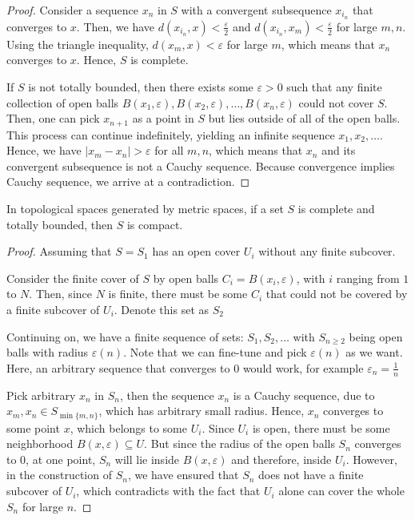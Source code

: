 \begin{proof}
  Consider a sequence \( x_{n} \) in \( S \) with a convergent subsequence \(
  x_{i_{n}} \) that converges to \( x \). Then, we have \( d(x_{i_{n}},x) <
  \frac{\varepsilon}{2} \) and \( d(x_{i_{n}}, x_{m}) < \frac{\varepsilon}{2} \)
  for large \( m, n \). Using the triangle inequality, \( d(x_{m}, x) <
  \varepsilon \) for large \( m \), which means that \( x_{n} \) converges to \(
  x\). Hence, \( S \) is complete.

  If \( S \) is not totally bounded, then there exists some \( \varepsilon>0 \)
  such that any finite collection of open balls \( B(x_{1}, \varepsilon),
  B(x_{2}, \varepsilon), \ldots, B(x_{n}, \varepsilon)  \) could not cover \( S
  \). Then, one can pick \( x_{n+1} \) as a point in \( S \) but lies outside of
  all of the open balls. This process can continue indefinitely, yielding an
  infinite sequence \( x_{1}, x_{2}, \ldots  \). Hence, we have
  \( |x_{m} - x_{n}| > \varepsilon \) for
  all \( m, n \), which means that \( x_{n} \) and its convergent subsequence is
  not a Cauchy sequence. Because convergence implies Cauchy sequence, we arrive
  at a contradiction.
\end{proof}

\begin{theorem}
  In topological spaces generated by metric spaces, if a set \( S \) is complete
  and totally bounded, then \( S \) is compact.
\end{theorem}

\begin{proof}
  Assuming that \( S = S_{1} \) has an open cover \( U_{i} \) without any
  finite subcover.

  Consider the finite cover of \( S \) by open balls \( C_{i} = B(x_{i},
  \varepsilon) \), with \( i \) ranging from \( 1 \) to \( N \). Then, since \(
  N\) is finite, there must be some \( C_{i} \) that could not be covered by a
  finite subcover of \( U_{i} \). Denote this set as \( S_{2} \)

  Continuing on, we have a finite sequence of sets: \( S_{1}, S_{2}, \ldots  \)
  with \( S_{n\ge 2} \) being open balls with radius \( \varepsilon(n) \). Note
  that we can fine-tune and pick \( \varepsilon(n) \) as we want. Here, an
  arbitrary sequence that converges to \( 0 \) would work, for example \(
  \varepsilon_{n} = \frac{1}{n} \)

  Pick arbitrary \( x_{n} \)  in \( S_{n} \), then the sequence \( x_{n} \) is a
  Cauchy sequence, due to \( x_{m}, x_{n} \in S_{\min \{m,n\}  } \), which has
  arbitrary small radius. Hence, \( x_{n} \) converges to some point \( x \),
  which belongs to some \( U_{i} \). Since \( U_{i} \) is open, there must be
  some neighborhood \( B(x, \varepsilon) \subseteq U \). But since the radius of
  the open balls \( S_{n} \) converges to \( 0 \), at one point, \( S_{n} \)
  will lie inside \( B(x, \varepsilon) \) and therefore, inside \( U_{i} \).
  However, in the construction of \( S_{n} \), we have ensured that \( S_{n} \)
  does not have a finite subcover of \( U_{i} \), which contradicts with the
  fact that \( U_{i} \) alone can cover the whole \( S_{n} \) for large \( n \).
\end{proof}

